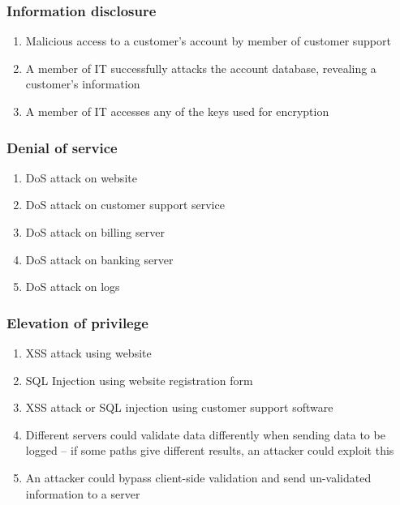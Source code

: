 \subsubsection{Information disclosure}

\begin{enumerate}[resume]
    \item \label{disclosureCustomerSupport} Malicious access to a customer's account by member of customer support
    
    \item \label{disclosureItDetails} A member of IT successfully attacks the account database, revealing a customer's information

    \item \label{disclosureItKeys} A member of IT accesses any of the keys used for encryption
\end{enumerate}

\subsubsection{Denial of service}

\begin{enumerate}[resume]
    \item \label{dosWebsite} DoS attack on website
    \item \label{dosCustomerSupport} DoS attack on customer support service
    \item \label{dosBillingServer} DoS attack on billing server
    \item \label{dosBankingServer} DoS attack on banking server
    \item \label{dosLogs} DoS attack on logs
\end{enumerate}

\subsubsection{Elevation of privilege}

\begin{enumerate}[resume]
    \item \label{eopXss} XSS attack using website
    \item \label{eopSqlInjection} SQL Injection using website registration form
    \item \label{eopCustomerSupport} XSS attack or SQL injection using customer support software
    \item \label{eopValidationDifference} Different servers could validate data differently when sending data to be logged – if some paths give different results, an attacker could exploit this
    \item \label{eopClientSideValidation} An attacker could bypass client-side validation and send un-validated information to a server
\end{enumerate}

